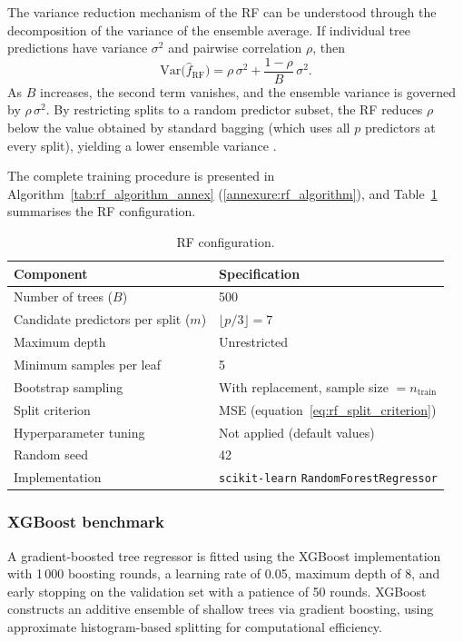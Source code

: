 The variance reduction mechanism of the RF can be understood
through the decomposition of the variance of the ensemble average.  If
individual tree predictions have variance $\sigma^{2}$ and pairwise
correlation $\rho$, then
\begin{equation}
    \mathrm{Var}\bigl(\hat{f}_{\mathrm{RF}}\bigr)
    =
    \rho\,\sigma^{2}
    +
    \frac{1 - \rho}{B}\,\sigma^{2}.
    \label{eq:rf_variance_reduction}
\end{equation}
As $B$ increases, the second term vanishes, and the ensemble variance is
governed by $\rho\,\sigma^{2}$.  By restricting splits to a random
predictor subset, the RF reduces $\rho$ below the value obtained by
standard bagging (which uses all $p$ predictors at every split), yielding
a lower ensemble variance \citep{hastie2009elements}.

The complete training procedure is presented in
Algorithm~\ref{tab:rf_algorithm_annex}
(\ref{annexure:rf_algorithm}), and
Table~\ref{tab:rf_hyperparameters_ch3} summarises the RF
configuration.

\begin{table}[H]
\centering
\small
\renewcommand{\arraystretch}{1.15}
\begin{tabular}{p{}p{}}
\toprule
\textbf{Component} & \textbf{Specification} \\
\midrule
Number of trees ($B$) & 500 \\
Candidate predictors per split ($m$) & $\lfloor p/3 \rfloor = 7$ \\
Maximum depth & Unrestricted \\
Minimum samples per leaf & 5 \\
Bootstrap sampling & With replacement, sample size $= n_{\mathrm{train}}$ \\
Split criterion & MSE (equation~\eqref{eq:rf_split_criterion}) \\
Hyperparameter tuning & Not applied (default values) \\
Random seed & 42 \\
Implementation & \texttt{scikit-learn} \texttt{Random\allowbreak{}Forest\allowbreak{}Regressor} \\
\bottomrule
\end{tabular}
\caption{RF configuration.}
\label{tab:rf_hyperparameters_ch3}
\end{table}


\subsubsection{XGBoost benchmark}
A gradient-boosted tree regressor is fitted using the XGBoost
implementation \citep{chen2016xgboost} with 1\,000 boosting rounds, a
learning rate of 0.05, maximum depth of 8, and early stopping on the
validation set with a patience of 50 rounds.  XGBoost constructs an
additive ensemble of shallow trees via gradient boosting, using
approximate histogram-based splitting for computational efficiency.

